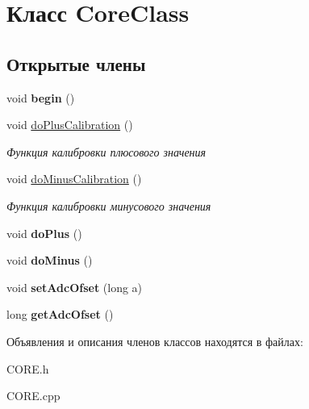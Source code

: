 \hypertarget{class_core_class}{\section{Класс Core\-Class}
\label{class_core_class}
}
\subsection*{Открытые члены}
\begin{DoxyCompactItemize}
\item 
\hypertarget{class_core_class_ad914b149c8a9d3fc9dfa451920c983e5}{void {\bfseries begin} ()}\label{class_core_class_ad914b149c8a9d3fc9dfa451920c983e5}

\item 
\hypertarget{class_core_class_a20e5f2dc5c20265bb055e0d75a3a7f44}{void \hyperlink{class_core_class_a20e5f2dc5c20265bb055e0d75a3a7f44}{do\-Plus\-Calibration} ()}\label{class_core_class_a20e5f2dc5c20265bb055e0d75a3a7f44}

\begin{DoxyCompactList}\small\item\em Функция калибровки плюсового значения \end{DoxyCompactList}\item 
\hypertarget{class_core_class_a77919f6f5a7b44d34bdd8b84d48b8000}{void \hyperlink{class_core_class_a77919f6f5a7b44d34bdd8b84d48b8000}{do\-Minus\-Calibration} ()}\label{class_core_class_a77919f6f5a7b44d34bdd8b84d48b8000}

\begin{DoxyCompactList}\small\item\em Функция калибровки минусового значения \end{DoxyCompactList}\item 
\hypertarget{class_core_class_aeb7da506c55533b54095d30598b88ef5}{void {\bfseries do\-Plus} ()}\label{class_core_class_aeb7da506c55533b54095d30598b88ef5}

\item 
\hypertarget{class_core_class_a73a7ab6063df4c0d5800af9a8135d20f}{void {\bfseries do\-Minus} ()}\label{class_core_class_a73a7ab6063df4c0d5800af9a8135d20f}

\item 
\hypertarget{class_core_class_a4e708cad4c776ee87a6c20aaeb454e65}{void {\bfseries set\-Adc\-Ofset} (long a)}\label{class_core_class_a4e708cad4c776ee87a6c20aaeb454e65}

\item 
\hypertarget{class_core_class_aea1e0015d419b376aa4a9625ab5e9cb5}{long {\bfseries get\-Adc\-Ofset} ()}\label{class_core_class_aea1e0015d419b376aa4a9625ab5e9cb5}

\end{DoxyCompactItemize}


Объявления и описания членов классов находятся в файлах\-:\begin{DoxyCompactItemize}
\item 
C\-O\-R\-E.\-h\item 
C\-O\-R\-E.\-cpp\end{DoxyCompactItemize}
